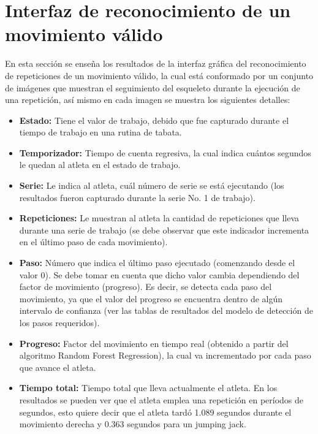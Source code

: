 \section{Interfaz de reconocimiento de un  movimiento v\'alido}
En esta secci\'on se ense\~na los resultados de la interfaz gr\'afica del reconocimiento de repeticiones de un movimiento v\'alido, la cual est\'a conformado por un conjunto de im\'agenes que muestran el seguimiento del esqueleto durante la ejecuci\'on de una repetici\'on, as\'i mismo en cada imagen se muestra los siguientes detalles:
\begin{itemize}
\item \textbf{Estado:} Tiene el valor de trabajo, debido que fue capturado durante el tiempo de trabajo en una rutina de tabata.
\item \textbf{Temporizador:} Tiempo de cuenta regresiva, la cual indica cu\'antos segundos le quedan al atleta en el estado de trabajo.
\item \textbf{Serie:} Le indica al atleta, cu\'al n\'umero de serie se est\'a ejecutando (los resultados fueron capturado durante la serie No. 1 de trabajo).
\item \textbf{Repeticiones:} Le muestran al atleta la cantidad de repeticiones que lleva durante una   serie de trabajo (se debe observar que este indicador incrementa en el \'ultimo paso de cada movimiento).
\item \textbf{Paso:} N\'umero que indica el \'ultimo paso ejecutado (comenzando desde el valor 0). Se debe tomar en cuenta que dicho valor cambia dependiendo del factor de movimiento (progreso). Es decir, se  detecta cada paso del movimiento, ya que el valor del progreso se encuentra dentro de alg\'un intervalo de confianza (ver las tablas de resultados del modelo de detecci\'on de los pasos requeridos).
\item \textbf{Progreso:} Factor del movimiento en tiempo real (obtenido a partir del algoritmo Random Forest Regression), la cual va incrementado por cada paso que avance el atleta.
\item \textbf{Tiempo total:} Tiempo total que lleva actualmente el atleta. En los resultados se pueden ver que el atleta emplea una repetici\'on en per\'iodos de segundos, esto quiere decir que el atleta tard\'o 1.089 segundos durante el movimiento derecha y  0.363 segundos para un jumping jack.
\end{itemize}
